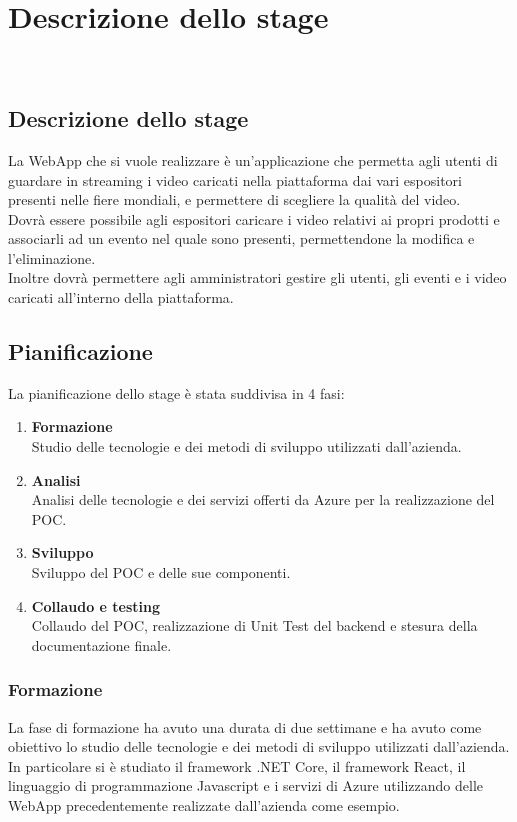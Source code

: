 \chapter{Descrizione dello stage}
\label{cap:analisi-requisiti}
\\
\section{Descrizione dello stage}
\label{sec:descrizione-stage}
La WebApp che si vuole realizzare è un'applicazione che permetta agli utenti di guardare in streaming i video caricati nella piattaforma dai vari espositori presenti nelle fiere mondiali, e permettere di scegliere la qualità del video.\\
Dovrà essere possibile agli espositori caricare i video relativi ai propri prodotti e associarli ad un evento nel quale sono presenti, permettendone la modifica e l'eliminazione.\\
Inoltre dovrà permettere agli amministratori gestire gli utenti, gli eventi e i video caricati all'interno della piattaforma.\\

\section{Pianificazione}
\label{sec:pianificazione}
La pianificazione dello stage è stata suddivisa in 4 fasi:
\begin{enumerate}
    \item \textbf{Formazione} \\
    Studio delle tecnologie e dei metodi di sviluppo utilizzati dall'azienda.
    \item \textbf{Analisi} \\
    Analisi delle tecnologie e dei servizi offerti da Azure per la realizzazione del POC.
    \item \textbf{Sviluppo} \\
    Sviluppo del POC e delle sue componenti.
    \item \textbf{Collaudo e testing} \\
    Collaudo del POC, realizzazione di Unit Test del backend e stesura della documentazione finale.
\end{enumerate}

\subsection{Formazione}
\label{subsec:formazione}
La fase di formazione ha avuto una durata di due settimane e ha avuto come obiettivo lo studio delle tecnologie e dei metodi di sviluppo utilizzati dall'azienda.\\
In particolare si è studiato il framework .NET Core, il framework React, il linguaggio di programmazione Javascript e i servizi di Azure utilizzando delle WebApp precedentemente realizzate dall'azienda come esempio.\\

